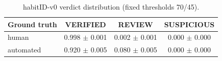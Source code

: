 \begin{table}[t]
\caption{habitID-v0 verdict distribution (fixed thresholds 70/45).}
\label{tab:v0verdicts}
\centering
\small
\begin{tabular}{lccc}
\toprule
Ground truth & VERIFIED & REVIEW & SUSPICIOUS \\
\midrule
human & 0.998 $\pm$ 0.001 & 0.002 $\pm$ 0.001 & 0.000 $\pm$ 0.000 \\
automated & 0.920 $\pm$ 0.005 & 0.080 $\pm$ 0.005 & 0.000 $\pm$ 0.000 \\
\bottomrule
\end{tabular}
\end{table}
